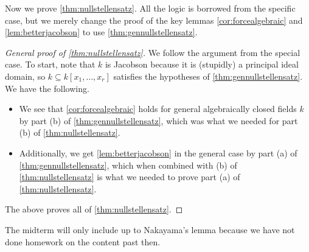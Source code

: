 \noindent Now we prove \autoref{thm:nullstellensatz}. All the logic is borrowed from the specific case, but we merely change the proof of the key lemmas \autoref{cor:forcealgebraic} and \autoref{lem:betterjacobson} to use \autoref{thm:gennullstellensatz}.
\begin{proof}[General proof of \autoref{thm:nullstellensatz}]
	We follow the argument from the special case. To start, note that $k$ is Jacobson because it is (stupidly) a principal ideal domain, so $k\subseteq k[x_1,\ldots,x_r]$ satisfies the hypotheses of \autoref{thm:gennullstellensatz}. We have the following.
	\begin{itemize}
		\item We see that \autoref{cor:forcealgebraic} holds for general algebraically closed fields $k$ by part (b) of \autoref{thm:gennullstellensatz}, which was what we needed for part (b) of \autoref{thm:nullstellensatz}.
		\item Additionally, we get \autoref{lem:betterjacobson} in the general case by part (a) of \autoref{thm:gennullstellensatz}, which when combined with (b) of \autoref{thm:nullstellensatz} is what we needed to prove part (a) of \autoref{thm:nullstellensatz}.
	\end{itemize}
	The above proves all of \autoref{thm:nullstellensatz}.
\end{proof}
\begin{remark}
	The midterm will only include up to Nakayama's lemma because we have not done homework on the content past then.
\end{remark}

